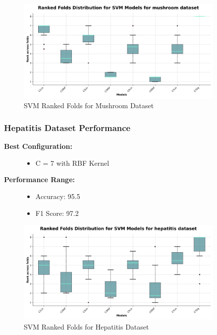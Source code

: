 \begin{figure}
    \centering
    \includegraphics[width=0.9\textwidth]{figures/ranked_folds_SVM_mushroom.png}
    \caption{SVM Ranked Folds for Mushroom Dataset}
    \label{fig:ranked_folds_svm_mushroom}
\end{figure}

\subsubsection{Hepatitis Dataset Performance}



\begin{description}
    \item[\textbf{Best Configuration:}]\leavevmode
        \begin{itemize}
            \item C = 7 with RBF Kernel
        \end{itemize}
    
    \item[\textbf{Performance Range:}]\leavevmode
        \begin{itemize}
            \item Accuracy: 95.5%
            \item F1 Score: 97.2%
        \end{itemize}
\end{description}

\begin{figure}
    \centering
    \includegraphics[width=0.9\textwidth]{figures/ranked_folds_SVM_hepatitis.png}
    \caption{SVM Ranked Folds for Hepatitis Dataset}
    \label{fig:ranked_folds_svm_hepatitis}
\end{figure}


